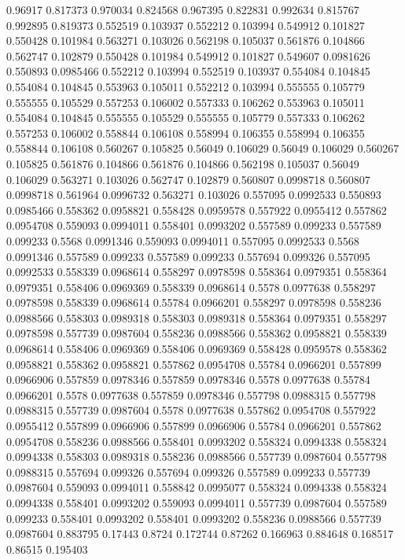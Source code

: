 0.96917 0.817373
0.970034 0.824568
0.967395 0.822831
0.992634 0.815767
0.992895 0.819373
0.552519 0.103937
0.552212 0.103994
0.549912 0.101827
0.550428 0.101984
0.563271 0.103026
0.562198 0.105037
0.561876 0.104866
0.562747 0.102879
0.550428 0.101984
0.549912 0.101827
0.549607 0.0981626
0.550893 0.0985466
0.552212 0.103994
0.552519 0.103937
0.554084 0.104845
0.554084 0.104845
0.553963 0.105011
0.552212 0.103994
0.555555 0.105779
0.555555 0.105529
0.557253 0.106002
0.557333 0.106262
0.553963 0.105011
0.554084 0.104845
0.555555 0.105529
0.555555 0.105779
0.557333 0.106262
0.557253 0.106002
0.558844 0.106108
0.558994 0.106355
0.558994 0.106355
0.558844 0.106108
0.560267 0.105825
0.56049 0.106029
0.56049 0.106029
0.560267 0.105825
0.561876 0.104866
0.561876 0.104866
0.562198 0.105037
0.56049 0.106029
0.563271 0.103026
0.562747 0.102879
0.560807 0.0998718
0.560807 0.0998718
0.561964 0.0996732
0.563271 0.103026
0.557095 0.0992533
0.550893 0.0985466
0.558362 0.0958821
0.558428 0.0959578
0.557922 0.0955412
0.557862 0.0954708
0.559093 0.0994011
0.558401 0.0993202
0.557589 0.099233
0.557589 0.099233
0.5568 0.0991346
0.559093 0.0994011
0.557095 0.0992533
0.5568 0.0991346
0.557589 0.099233
0.557589 0.099233
0.557694 0.099326
0.557095 0.0992533
0.558339 0.0968614
0.558297 0.0978598
0.558364 0.0979351
0.558364 0.0979351
0.558406 0.0969369
0.558339 0.0968614
0.5578 0.0977638
0.558297 0.0978598
0.558339 0.0968614
0.55784 0.0966201
0.558297 0.0978598
0.558236 0.0988566
0.558303 0.0989318
0.558303 0.0989318
0.558364 0.0979351
0.558297 0.0978598
0.557739 0.0987604
0.558236 0.0988566
0.558362 0.0958821
0.558339 0.0968614
0.558406 0.0969369
0.558406 0.0969369
0.558428 0.0959578
0.558362 0.0958821
0.558362 0.0958821
0.557862 0.0954708
0.55784 0.0966201
0.557899 0.0966906
0.557859 0.0978346
0.557859 0.0978346
0.5578 0.0977638
0.55784 0.0966201
0.5578 0.0977638
0.557859 0.0978346
0.557798 0.0988315
0.557798 0.0988315
0.557739 0.0987604
0.5578 0.0977638
0.557862 0.0954708
0.557922 0.0955412
0.557899 0.0966906
0.557899 0.0966906
0.55784 0.0966201
0.557862 0.0954708
0.558236 0.0988566
0.558401 0.0993202
0.558324 0.0994338
0.558324 0.0994338
0.558303 0.0989318
0.558236 0.0988566
0.557739 0.0987604
0.557798 0.0988315
0.557694 0.099326
0.557694 0.099326
0.557589 0.099233
0.557739 0.0987604
0.559093 0.0994011
0.558842 0.0995077
0.558324 0.0994338
0.558324 0.0994338
0.558401 0.0993202
0.559093 0.0994011
0.557739 0.0987604
0.557589 0.099233
0.558401 0.0993202
0.558401 0.0993202
0.558236 0.0988566
0.557739 0.0987604
0.883795 0.17443
0.8724 0.172744
0.87262 0.166963
0.884648 0.168517
0.86515 0.195403
